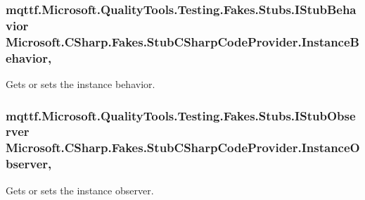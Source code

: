 \hypertarget{class_microsoft_1_1_c_sharp_1_1_fakes_1_1_stub_c_sharp_code_provider_ac99f8b97e6cde4c82c3ef5967b7a9845}{
\subsubsection[{Instance\-Behavior}]{\setlength{\rightskip}{0pt plus 5cm}mqttf.\-Microsoft.\-Quality\-Tools.\-Testing.\-Fakes.\-Stubs.\-I\-Stub\-Behavior Microsoft.\-C\-Sharp.\-Fakes.\-Stub\-C\-Sharp\-Code\-Provider.\-Instance\-Behavior\hspace{0.3cm}{\ttfamily [get]}, {\ttfamily [set]}}}\label{class_microsoft_1_1_c_sharp_1_1_fakes_1_1_stub_c_sharp_code_provider_ac99f8b97e6cde4c82c3ef5967b7a9845}


Gets or sets the instance behavior.

\hypertarget{class_microsoft_1_1_c_sharp_1_1_fakes_1_1_stub_c_sharp_code_provider_ad3bb20dbca2e88de23d8c3a9ac04fb61}{
\subsubsection[{Instance\-Observer}]{\setlength{\rightskip}{0pt plus 5cm}mqttf.\-Microsoft.\-Quality\-Tools.\-Testing.\-Fakes.\-Stubs.\-I\-Stub\-Observer Microsoft.\-C\-Sharp.\-Fakes.\-Stub\-C\-Sharp\-Code\-Provider.\-Instance\-Observer\hspace{0.3cm}{\ttfamily [get]}, {\ttfamily [set]}}}\label{class_microsoft_1_1_c_sharp_1_1_fakes_1_1_stub_c_sharp_code_provider_ad3bb20dbca2e88de23d8c3a9ac04fb61}


Gets or sets the instance observer.

